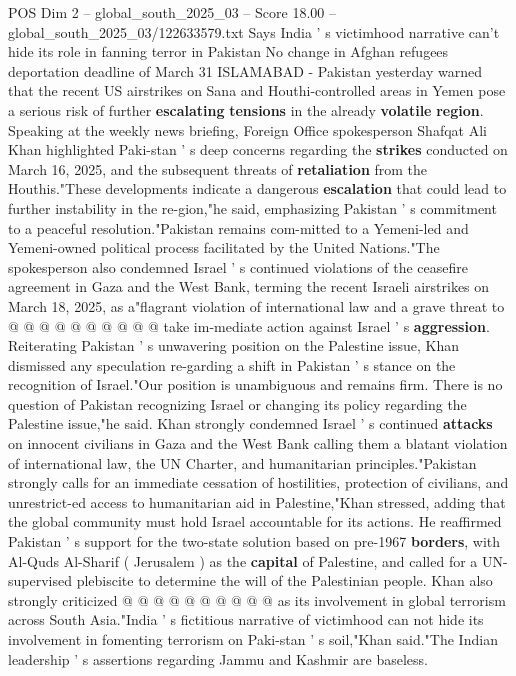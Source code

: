 \begin{textsample}{POS Dim 2 – global\_south\_2025\_03 – Score 18.00 – global\_south\_2025\_03/122633579.txt}  \label{ex:f2_pos_285}
Says India ' s victimhood narrative can't hide its role in fanning terror in Pakistan No change in Afghan refugees deportation deadline of March 31 ISLAMABAD - Pakistan yesterday warned that the recent US airstrikes on Sana and Houthi-controlled areas in Yemen pose a serious risk of further \textbf{escalating} \textbf{tensions} in the already \textbf{volatile} \textbf{region}.
Speaking at the weekly news briefing, Foreign Office spokesperson Shafqat Ali Khan highlighted Paki-stan ' s deep concerns regarding the \textbf{strikes} conducted on March 16, 2025, and the subsequent threats of \textbf{retaliation} from the Houthis."These developments indicate a dangerous \textbf{escalation} that could lead to further instability in the re-gion,"he said, emphasizing Pakistan ' s commitment to a peaceful resolution."Pakistan remains com-mitted to a Yemeni-led and Yemeni-owned political process facilitated by the United Nations."The spokesperson also condemned Israel ' s continued violations of the ceasefire agreement in Gaza and the West Bank, terming the recent Israeli airstrikes on March 18, 2025, as a"flagrant violation of international law and a grave threat to @ @ @ @ @ @ @ @ @ @ take im-mediate action against Israel ' s \textbf{aggression}.
Reiterating Pakistan ' s unwavering position on the Palestine issue, Khan dismissed any speculation re-garding a shift in Pakistan ' s stance on the recognition of Israel."Our position is unambiguous and remains firm.
There is no question of Pakistan recognizing Israel or changing its policy regarding the Palestine issue,"he said.
Khan strongly condemned Israel ' s continued \textbf{attacks} on innocent civilians in Gaza and the West Bank calling them a blatant violation of international law, the UN Charter, and humanitarian principles."Pakistan strongly calls for an immediate cessation of hostilities, protection of civilians, and unrestrict-ed access to humanitarian aid in Palestine,"Khan stressed, adding that the global community must hold Israel accountable for its actions.
He reaffirmed Pakistan ' s support for the two-state solution based on pre-1967 \textbf{borders}, with Al-Quds Al-Sharif ( Jerusalem ) as the \textbf{capital} of Palestine, and called for a UN-supervised plebiscite to determine the will of the Palestinian people.
Khan also strongly criticized @ @ @ @ @ @ @ @ @ @ as its involvement in global terrorism across South Asia."India ' s fictitious narrative of victimhood can not hide its involvement in fomenting terrorism on Paki-stan ' s soil,"Khan said."The Indian leadership ' s assertions regarding Jammu and Kashmir are baseless.

\end{textsample}
